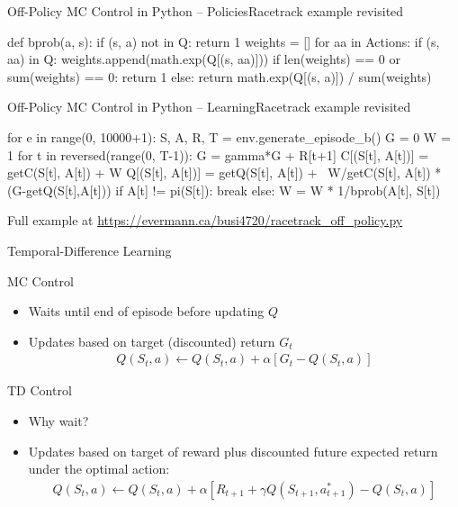 \documentclass[ignorenonframetext,xcolor=x11names]{beamer}
\begin{document}
\begin{frame}[fragile]{Off-Policy MC Control in Python -- Policies}{Racetrack example revisited}
\begin{pythoncode}
def bprob(a, s):
    if (s, a) not in Q:
        return 1
    weights = []
    for aa in Actions:
        if (s, aa) in Q:
            weights.append(math.exp(Q[(s, aa)]))
    if len(weights) == 0 or sum(weights) == 0:
        return 1
    else:
        return math.exp(Q[(s, a)]) / sum(weights)
\end{pythoncode}
\end{frame}



\begin{frame}[fragile]{Off-Policy MC Control in Python -- Learning}{Racetrack example revisited}
\begin{pythoncode}
for e in range(0, 10000+1):
    S, A, R, T = env.generate_episode_b()
    G = 0
    W = 1
    for t in reversed(range(0, T-1)):
        G = gamma*G + R[t+1]
        C[(S[t], A[t])] = getC(S[t], A[t]) + W
        Q[(S[t], A[t])] = getQ(S[t], A[t]) + \
               W/getC(S[t], A[t]) * (G-getQ(S[t],A[t]))
        if A[t] != pi(S[t]):
            break
        else:
            W = W * 1/bprob(A[t], S[t])
\end{pythoncode}
\footnotesize

Full example at \url{https://evermann.ca/busi4720/racetrack_off_policy.py}
\end{frame}

\begin{frame}{Temporal-Difference Learning}
\begin{block}{MC Control}
\begin{itemize}
   \item Waits until end of episode before updating $Q$
   \item Updates based on target (discounted) return $G_t$ 
   \begin{align*}
   Q(S_t, a) \leftarrow Q(S_t, a) + \alpha \left[ G_t - Q(S_t, a) \right]
   \end{align*}
\end{itemize}
\end{block}

\begin{block}{TD Control}
\begin{itemize}
   \item Why wait?
   \item Updates based on target of reward plus discounted future expected return under the optimal action:
   \begin{align*}
   Q(S_t, a) \leftarrow Q(S_t, a) + \alpha \left[ R_{t+1} + \gamma Q(S_{t+1}, a_{t+1}^*) - Q(S_t, a) \right]
   \end{align*}
\end{itemize}
\end{block}
\end{frame}
\end{document}

